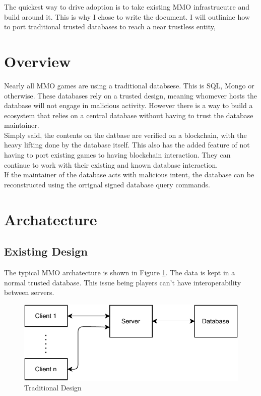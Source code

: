 \documentclass[runningheads,a4paper]{llncs}
\begin{document}
The quickest way to drive adoption is to take existing MMO infrastrucutre and build
around it. This is why I chose to write the document. I will outlinine how to
port traditional trusted databases to reach a near trustless entity,

\section{Overview}
Nearly all MMO games are using a traditional databsese. This is SQL, Mongo or otherwise.
These databases rely on a trusted design, meaning whomever hosts the database will not 
engage in malicious activity. However there is a way to build a ecosystem that relies
on a central database without having to trust the database maintainer.
\\

Simply said, the contents on the datbase are verified on a blockchain, with the
heavy lifting done by the database itself. This also has the added feature of
not having to port existing games to having blockchain interaction. They can
continue to work with their existing and known database interaction.
\\

If the maintainer of the database acts with malicious intent, the database can
be reconstructed using the orrignal signed database query commands.

\newpage

\section{Archatecture}
\subsection{Existing Design}
The typical MMO archatecture is shown in Figure \ref{trad}. The data is kept in
a normal trusted database.  This issue being players can't have interoperability
between servers.

\begin{figure}[H]
\centering
\includegraphics[scale=1]{img/traditional.pdf}
\caption{Traditional Design}
\label{trad}
\end{figure}
\end{document}
